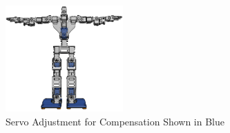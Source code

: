 \begin{enumerate}[label=\Alph*.]
    \begin{figure} [h] \centering
      \includegraphics[width=0.4\textwidth]{gambar/controlled_servo.png}
      \caption{Servo Adjustment for Compensation Shown in Blue}
      \label{fig:Controlled_Servo}
    \end{figure}

\end{enumerate}

